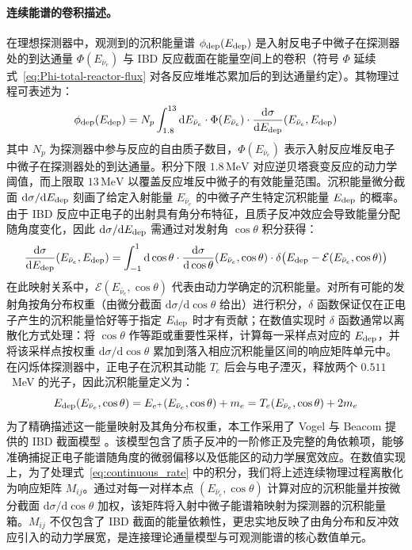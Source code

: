 \paragraph{连续能谱的卷积描述。}
在理想探测器中，观测到的沉积能量谱 $\phi_{\rm dep}(E_{\rm dep})$ 是入射反电子中微子在探测器处的到达通量 $\Phi(E_{\bar{\nu}_e})$ 与 IBD 反应截面在能量空间上的卷积（符号 $\Phi$ 延续式~\eqref{eq:Phi-total-reactor-flux} 对各反应堆堆芯累加后的到达通量约定）。其物理过程可表述为：
\begin{equation}
\label{eq:continuous_rate}
\phi_{\rm dep}(E_{\rm dep}) = N_p \int_{1.8}^{13} \mathrm{d}E_{\bar{\nu}_e} \cdot \Phi(E_{\bar{\nu}_e}) \cdot \frac{\mathrm{d}\sigma}{\mathrm{d}E_{\rm dep}}(E_{\bar{\nu}_e}, E_{\rm dep})
\end{equation}
其中 $N_p$ 为探测器中参与反应的自由质子数目，$\Phi(E_{\bar{\nu}_e})$ 表示入射反应堆反电子中微子在探测器处的到达通量。积分下限 $1.8\,\mathrm{MeV}$ 对应逆贝塔衰变反应的动力学阈值，而上限取 $13\,\mathrm{MeV}$ 以覆盖反应堆反中微子的有效能量范围。沉积能量微分截面 $\mathrm{d}\sigma/\mathrm{d}E_{\rm dep}$ 刻画了给定入射能量 $E_{\bar{\nu}_e}$ 的中微子产生特定沉积能量 $E_{\rm dep}$ 的概率。由于 IBD 反应中正电子的出射具有角分布特征，且质子反冲效应会导致能量分配随角度变化，因此 $\mathrm{d}\sigma/\mathrm{d}E_{\rm dep}$ 需通过对发射角 $\cos\theta$ 积分获得：
\begin{equation}
\frac{\mathrm{d}\sigma}{\mathrm{d}E_{\rm dep}}(E_{\bar{\nu}_e}, E_{\rm dep}) = \int_{-1}^{1} \mathrm{d}\cos\theta \cdot \frac{\mathrm{d}\sigma}{\mathrm{d}\cos\theta}(E_{\bar{\nu}_e}, \cos\theta) \cdot \delta\bigl(E_{\rm dep} - \mathcal{E}(E_{\bar{\nu}_e}, \cos\theta)\bigr)
\label{eq:dsigma-dEdep}
\end{equation}
在此映射关系中，$\mathcal{E}(E_{\bar{\nu}_e}, \cos\theta)$ 代表由动力学确定的沉积能量。对所有可能的发射角按角分布权重（由微分截面 $\mathrm{d}\sigma/\mathrm{d}\cos\theta$ 给出）进行积分，$\delta$ 函数保证仅在正电子产生的沉积能量恰好等于指定 $E_{\rm dep}$ 时才有贡献；在数值实现时 $\delta$ 函数通常以离散化方式处理：将 $\cos\theta$ 作等距或重要性采样，计算每一采样点对应的 $E_{\rm dep}$，并将该采样点按权重 $\mathrm{d}\sigma/\mathrm{d}\cos\theta$ 累加到落入相应沉积能量区间的响应矩阵单元中。在闪烁体探测器中，正电子在沉积其动能 $T_e$ 后会与电子湮灭，释放两个 $0.511$~MeV 的光子，因此沉积能量定义为：
\begin{equation}
E_{\rm dep}(E_{\bar{\nu}_e}, \cos\theta) = E_{e^+}(E_{\bar{\nu}_e}, \cos\theta) + m_e = T_e(E_{\bar{\nu}_e}, \cos\theta) + 2m_e
\label{eq:Edep-positron}
\end{equation}
为了精确描述这一能量映射及其角分布权重，本工作采用了 Vogel 与 Beacom 提供的 IBD 截面模型 \cite{Vogel1999Neutrino}。该模型包含了质子反冲的一阶修正及完整的角依赖项，能够准确捕捉正电子能谱随角度的微弱偏移以及低能区的动力学展宽效应。在数值实现上，为了处理式~\eqref{eq:continuous_rate} 中的积分，我们将上述连续物理过程离散化为响应矩阵 $M_{ij}$。通过对每一对样本点 $(E_{\bar{\nu}_e}, \cos\theta)$ 计算对应的沉积能量并按微分截面 $\mathrm{d}\sigma/\mathrm{d}\cos\theta$ 加权，该矩阵将入射中微子能谱箱映射为探测器的沉积能量箱。$M_{ij}$ 不仅包含了 IBD 截面的能量依赖性，更忠实地反映了由角分布和反冲效应引入的动力学展宽，是连接理论通量模型与可观测能谱的核心数值单元。

